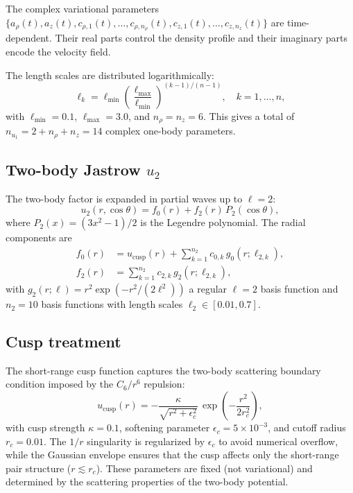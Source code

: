 \documentclass[aps,prl,onecolumn,superscriptaddress,longbibliography,nofootinbib]{revtex4-2}
\begin{document}
The complex variational parameters $\{a_\rho(t), a_z(t),
c_{\rho,1}(t),\ldots,c_{\rho,n_\rho}(t), c_{z,1}(t),\ldots,
c_{z,n_z}(t)\}$ are time-dependent.  Their real parts control the
density profile and their imaginary parts encode the velocity field.

The length scales are distributed logarithmically:
\begin{equation}
\ell_k = \ell_{\min}\left(\frac{\ell_{\max}}{\ell_{\min}}\right)^{(k-1)/(n-1)},
\quad k=1,\ldots,n,
\end{equation}
with $\ell_{\min}=0.1$, $\ell_{\max}=3.0$, and $n_\rho=n_z=6$.
This gives a total of $n_{u_1}=2+n_\rho+n_z=14$ complex one-body
parameters.

\subsection{Two-body Jastrow $u_2$}

The two-body factor is expanded in partial waves up to $\ell=2$:
\begin{equation}
u_2(r,\cos\theta) = f_0(r) + f_2(r)\,P_2(\cos\theta),
\end{equation}
where $P_2(x)=(3x^2-1)/2$ is the Legendre polynomial.  The radial
components are
\begin{align}
f_0(r) &= u_{\mathrm{cusp}}(r)
+ \sum_{k=1}^{n_2} c_{0,k}\,g_0(r;\ell_{2,k}),
\label{eq:f0}\\
f_2(r) &= \sum_{k=1}^{n_2} c_{2,k}\,g_2(r;\ell_{2,k}),
\label{eq:f2}
\end{align}
with $g_2(r;\ell)=r^2\exp(-r^2/(2\ell^2))$ a regular $\ell=2$ basis
function and $n_2=10$ basis functions with length scales
$\ell_2\in[0.01,0.7]$.

\subsection{Cusp treatment}

The short-range cusp function captures the two-body scattering boundary
condition imposed by the $C_6/r^6$ repulsion:
\begin{equation}
u_{\mathrm{cusp}}(r) = -\frac{\kappa}{\sqrt{r^2+\epsilon_c^2}}\,
\exp\!\left(-\frac{r^2}{2r_c^2}\right),
\label{eq:cusp}
\end{equation}
with cusp strength $\kappa=0.1$, softening parameter
$\epsilon_c=5\times10^{-3}$, and cutoff radius $r_c=0.01$.
The $1/r$ singularity is regularized by $\epsilon_c$ to avoid
numerical overflow, while the Gaussian envelope ensures that the cusp
affects only the short-range pair structure ($r\lesssim r_c$).  These
parameters are fixed (not variational) and determined by the scattering
properties of the two-body potential.
\end{document}
